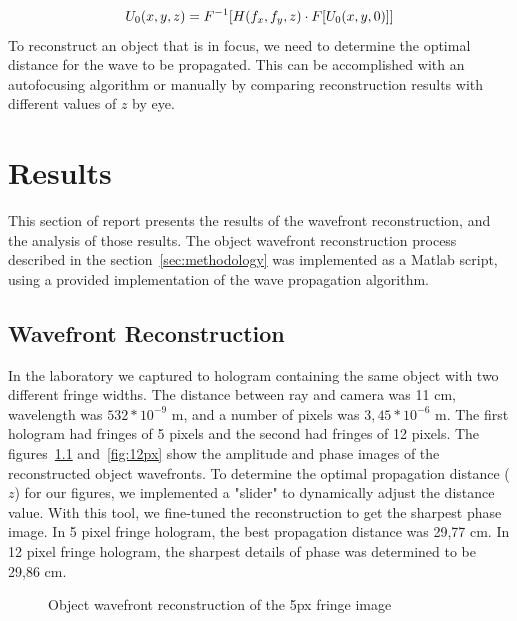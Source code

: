 \documentclass[12pt,a4paper,english
]{tunithesis}
\begin{document}
\begin{align}
U_0(x,y,z) &= F^{-1}[H(f_x,f_y,z) \cdot F[U_0(x,y,0)]] \notag \\
\label{eq:projection}
\end{align}
To reconstruct an object that is in focus, we need to determine the optimal distance for the wave to be propagated. This can be accomplished with an autofocusing algorithm or manually by comparing reconstruction results with different values of $z$ by eye.

\chapter{Results}
\label{sec:results}
This section of report presents the results of the wavefront reconstruction, and the analysis of those results.
The object wavefront reconstruction process described in the section~\ref{sec:methodology} was implemented as a Matlab script, using a provided implementation of the wave propagation algorithm. 

\section{Wavefront Reconstruction}
In the laboratory we captured to hologram containing the same object with two different fringe widths. The distance between ray and camera was 11 cm, wavelength was ${532 * 10^{-9}}$ m, and a number of pixels was ${3,45*10^{-6}}$ m. The first hologram had fringes of 5 pixels and the second had fringes of 12 pixels. The figures~\ref{fig:5px} and~\ref{fig:12px} show the amplitude and phase images of the reconstructed object wavefronts. 
To determine the optimal propagation distance ($z$) for our figures, we implemented a "slider" to dynamically adjust the distance value. With this tool, we fine-tuned the reconstruction to get the sharpest phase image. In 5 pixel fringe hologram, the best propagation distance was 29,77 cm. In 12 pixel fringe hologram, the sharpest details of phase was determined to be 29,86 cm.

\begin{figure}
  \centering
  \caption{Object wavefront reconstruction of the 5px fringe image}
   \label{fig:5px}
\end{figure}
\end{document}
